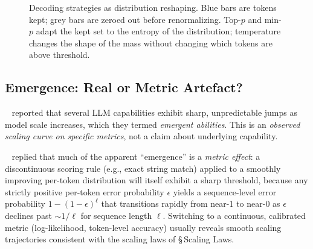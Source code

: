 \begin{figure}[H]
  \centering
  
  \caption{Decoding strategies as distribution reshaping. Blue
           bars are tokens kept; grey bars are zeroed out before
           renormalizing. Top-$p$ and min-$p$ adapt the kept set
           to the entropy of the distribution; temperature changes
           the shape of the mass without changing which tokens
           are above threshold.}
  \label{fig:decoding_strategies}
\end{figure}

\subsection{Emergence: Real or Metric Artefact?}

\Emp\ \citet{wei2022emergent} reported that several LLM capabilities
exhibit sharp, unpredictable jumps as model scale increases, which
they termed \emph{emergent abilities}. This is an \emph{observed
scaling curve on specific metrics}, not a claim about underlying
capability.

\Ident\ \citet{schaeffer2023mirage} replied that much of the
apparent ``emergence'' is a \emph{metric effect}: a discontinuous
scoring rule (e.g., exact string match) applied to a smoothly
improving per-token distribution will itself exhibit a sharp
threshold, because any strictly positive per-token error probability
$\epsilon$ yields a sequence-level error probability
$1 - (1-\epsilon)^{\ell}$ that transitions rapidly from near-1 to
near-0 as $\epsilon$ declines past $\sim 1/\ell$ for sequence length
$\ell$. Switching to a continuous, calibrated metric (log-likelihood,
token-level accuracy) usually reveals smooth scaling trajectories
consistent with the scaling laws of \S\,Scaling Laws.

